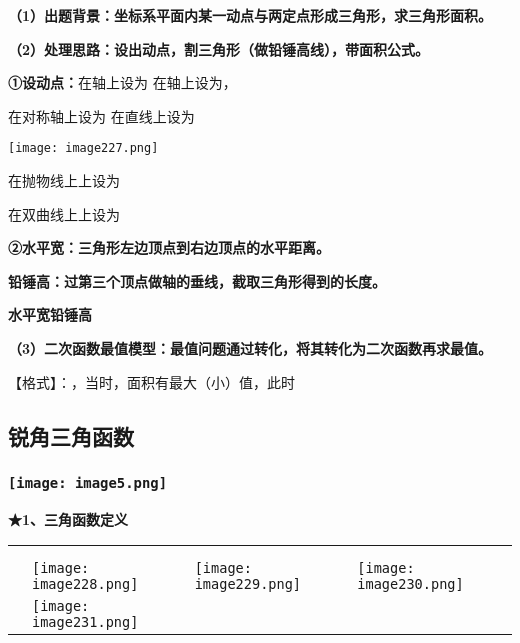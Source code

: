 \textbf{（1）出题背景：坐标系平面内某一动点与两定点形成三角形，求三角形面积。}

\textbf{（2）处理思路：设出动点，割三角形（做铅锤高线），带面积公式。}

\textbf{①设动点：}在轴上设为 在轴上设为，

在对称轴上设为 在直线上设为

\texttt{[image: image227.png]}

在抛物线上上设为

在双曲线上上设为

\textbf{②水平宽：三角形左边顶点到右边顶点的水平距离。}

\textbf{铅锤高：过第三个顶点做轴的垂线，截取三角形得到的长度。}

\textbf{水平宽铅锤高}

\textbf{（3）二次函数最值模型：最值问题通过转化，将其转化为二次函数再求最值。}

【格式】：，当时，面积有最大（小）值，此时

\hypertarget{ux9510ux89d2ux4e09ux89d2ux51fdux6570}{%
\subsection{\texorpdfstring{
锐角三角函数}{ 锐角三角函数}}\label{ux9510ux89d2ux4e09ux89d2ux51fdux6570}}

\hypertarget{ux5b66ux79d1ux7f51www.zxxk.com--ux6559ux80b2ux8d44ux6e90ux95e8ux6237ux63d0ux4f9bux8bd5ux9898ux8bd5ux5377ux6559ux6848ux8bfeux4ef6ux6559ux5b66ux8bbaux6587ux7d20ux6750ux7b49ux5404ux7c7bux6559ux5b66ux8d44ux6e90ux5e93ux4e0bux8f7dux8fd8ux6709ux5927ux91cfux4e30ux5bccux7684ux6559ux5b66ux8d44ux8baf-41}{%
\subsubsection{\texorpdfstring{\protect\texttt{[image: image5.png]}}{学科网(www.zxxk.com)-\/-教育资源门户，提供试题试卷、教案、课件、教学论文、素材等各类教学资源库下载，还有大量丰富的教学资讯！}}\label{ux5b66ux79d1ux7f51www.zxxk.com--ux6559ux80b2ux8d44ux6e90ux95e8ux6237ux63d0ux4f9bux8bd5ux9898ux8bd5ux5377ux6559ux6848ux8bfeux4ef6ux6559ux5b66ux8bbaux6587ux7d20ux6750ux7b49ux5404ux7c7bux6559ux5b66ux8d44ux6e90ux5e93ux4e0bux8f7dux8fd8ux6709ux5927ux91cfux4e30ux5bccux7684ux6559ux5b66ux8d44ux8baf-41}}

\textbf{★1、三角函数定义}

\begin{longtable}[]{@{}llll@{}}
\toprule
\endhead
& & &\tabularnewline
& & &\tabularnewline
&
\texttt{[image: image228.png]}
&
\texttt{[image: image229.png]}
&
\texttt{[image: image230.png]}\tabularnewline
&
\texttt{[image: image231.png]}
& &\tabularnewline
\bottomrule
\end{longtable}

